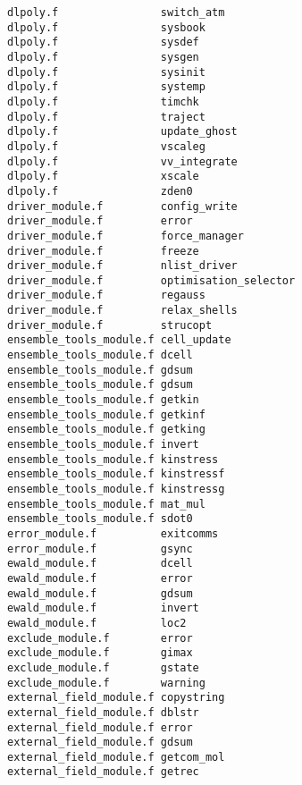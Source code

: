 \begin{verbatim}
dlpoly.f                switch_atm            
dlpoly.f                sysbook               
dlpoly.f                sysdef                
dlpoly.f                sysgen                
dlpoly.f                sysinit               
dlpoly.f                systemp               
dlpoly.f                timchk                    
dlpoly.f                traject                   
dlpoly.f                update_ghost              
dlpoly.f                vscaleg                   
dlpoly.f                vv_integrate              
dlpoly.f                xscale                    
dlpoly.f                zden0                     
driver_module.f         config_write              
driver_module.f         error                     
driver_module.f         force_manager         
driver_module.f         freeze                
driver_module.f         nlist_driver              
driver_module.f         optimisation_selector     
driver_module.f         regauss                   
driver_module.f         relax_shells              
driver_module.f         strucopt              
ensemble_tools_module.f cell_update               
ensemble_tools_module.f dcell                     
ensemble_tools_module.f gdsum                     
ensemble_tools_module.f gdsum                     
ensemble_tools_module.f getkin                    
ensemble_tools_module.f getkinf                   
ensemble_tools_module.f getking                   
ensemble_tools_module.f invert                    
ensemble_tools_module.f kinstress                 
ensemble_tools_module.f kinstressf                
ensemble_tools_module.f kinstressg                
ensemble_tools_module.f mat_mul                   
ensemble_tools_module.f sdot0                     
error_module.f          exitcomms                 
error_module.f          gsync                     
ewald_module.f          dcell                     
ewald_module.f          error                     
ewald_module.f          gdsum                     
ewald_module.f          invert                    
ewald_module.f          loc2                      
exclude_module.f        error                     
exclude_module.f        gimax                     
exclude_module.f        gstate                    
exclude_module.f        warning                   
external_field_module.f copystring                
external_field_module.f dblstr                    
external_field_module.f error                     
external_field_module.f gdsum                     
external_field_module.f getcom_mol                
external_field_module.f getrec                    

\end{verbatim}

